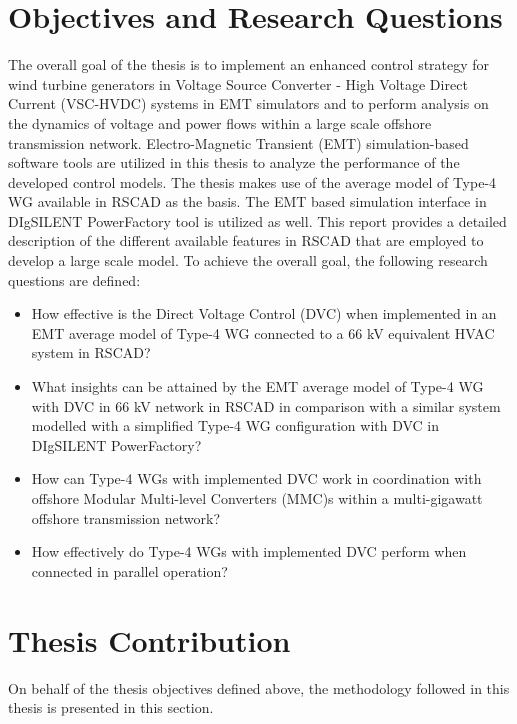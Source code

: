 \section{Objectives and Research Questions}
The overall goal of the thesis is to implement an enhanced control strategy for wind turbine generators in Voltage Source Converter - High Voltage Direct Current (\gls{VSC}-\gls{HVDC}) systems in \gls{EMT} simulators and to perform analysis on the dynamics of voltage and power flows within a large scale offshore transmission network. Electro-Magnetic Transient (\gls{EMT}) simulation-based software tools are utilized in this thesis to analyze the performance of the developed control models. The thesis makes use of the average model of Type-4 \gls{WG} available in RSCAD as the basis. The \gls{EMT} based simulation interface in DIgSILENT PowerFactory tool is utilized as well. This report provides a detailed description of the different available features in RSCAD that are employed to develop a large scale model. 
To achieve the overall goal, the following research questions are defined:
\begin{itemize}
    \item How effective is the Direct Voltage Control (\gls{DVC}) when implemented in an \gls{EMT} average model of Type-4 \gls{WG} connected to a 66 kV equivalent \gls{HVAC} system in RSCAD?
    
    \item What insights can be attained by the \gls{EMT} average model of Type-4 \gls{WG} with \gls{DVC} in 66 kV network in RSCAD in comparison with a similar system modelled with a simplified Type-4 \gls{WG} configuration with \gls{DVC} in DIgSILENT PowerFactory?
    
    \item How can Type-4 \gls{WG}s with implemented \gls{DVC} work in coordination with offshore Modular Multi-level Converters (\gls{MMC})s within a multi-gigawatt offshore transmission network?
    
    \item How effectively do Type-4 \gls{WG}s with implemented \gls{DVC} perform when connected in parallel operation?

\end{itemize}

\section{Thesis Contribution}
On behalf of the thesis objectives defined above, the methodology followed in this thesis is presented in this section.

